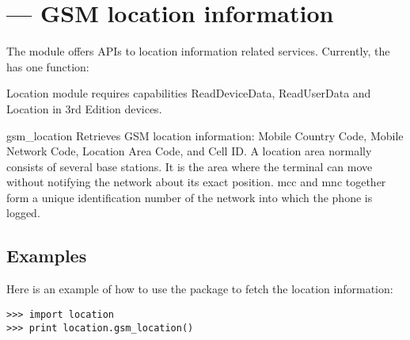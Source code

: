 %
%
%

\section{ ---
	 GSM location information}
\label{sec:location}


The  module offers APIs to location information related 
services. Currently, the  has one function:

\begin{notice}[note]
Location module requires capabilities ReadDeviceData, ReadUserData and Location
in 3rd Edition devices.
\end{notice}

\begin{funcdesc}{gsm_location}{}
Retrieves GSM location information: Mobile Country Code, Mobile Network Code, 
Location Area Code, and Cell ID. A location area normally consists of several 
base stations. It is the area where the terminal can move without notifying the 
network about its exact position. mcc and mnc together form a unique 
identification number of the network into which the phone is logged.
\end{funcdesc}

\subsection{Examples}

Here is an example of how to use the  package to
fetch the location information:

\begin{verbatim}
>>> import location
>>> print location.gsm_location()
\end{verbatim}
